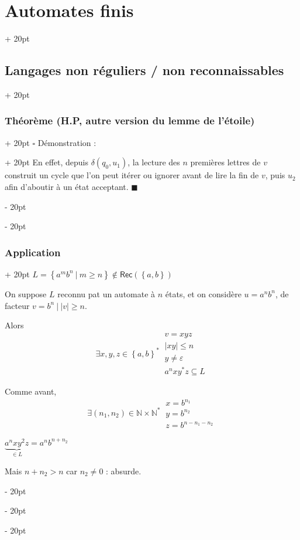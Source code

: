 \documentclass[a4paper, 12pt, twoside]{article}
\newcommand{\N}{\mathbb{N}} %
\newcommand{\lr}[1]{\left( #1 \right)}
\newcommand{\set}[1]{\left\{ #1 \right\}}
\newcommand{\abs}[1]{\left\lvert #1 \right\rvert}
\renewcommand{\le}{\leqslant}
\renewcommand{\ge}{\geqslant}
\newcommand{\ind}[1][20pt]{\advance\leftskip + #1}
\newcommand{\deind}[1][20pt]{\advance\leftskip - #1}
\newenvironment{indt}[2][20pt]{#2 \par \ind[#1]}{\par \deind} %
\newenvironment{proof}[1][{Démonstration :}]{\begin{indt}{$\square$ #1}}{$\blacksquare$ \end{indt}}
\newcommand{\Rec}[1]{\mathsf{Rec}\!\lr{#1}}
\begin{document}
\begin{indt}{\section{Automates finis}}
\begin{indt}{\subsection{Langages non réguliers / non reconnaissables}}
\begin{indt}{\subsubsection{Théorème (H.P, autre version du lemme de l'étoile)}}
\begin{proof}
                    En effet, depuis $\delta(q_0, u_1)$, la lecture des $n$ premières lettres de $v$ construit un cycle que l'on peut itérer ou ignorer avant de lire la fin de $v$, puis $u_2$ afin d'aboutir à un état acceptant.
                \end{proof}
            \end{indt}

            \vspace{12pt}
            
            \begin{indt}{\subsubsection{Application}}
                $L = \set{a^mb^n\ |\ m \ge n} \notin \Rec{\set{a, b}}$

                On suppose $L$ reconnu pat un automate à $n$ états, et on considère $u = a^n b^n$, de facteur $v = b^n\ |\ \abs v \ge n$.

                Alors
                \[
                    \exists x, y, z \in \set{a, b}^*\
                    \begin{array}{|l}
                        v = xyz
                        \\
                        \abs{xy} \le n
                        \\
                        y \neq \varepsilon
                        \\
                        a^nx y^* z \subseteq L
                    \end{array}
                \]

                Comme avant,
                \[
                    \exists (n_1, n_2) \in \N \times \N^*\
                    \begin{array}{|l}
                        x = b^{n_1}
                        \\
                        y = b^{n_2}
                        \\
                        z = b^{n - n_1 - n_2}
                    \end{array}
                \]

                $\underbrace{a^n xy^2z}_{\in L} = a^n b^{n + n_2}$

                Mais $n + n_2 > n$ car $n_2 \neq 0$ : absurde.
            \end{indt}
        \end{indt}
    \end{indt}
\end{document}
